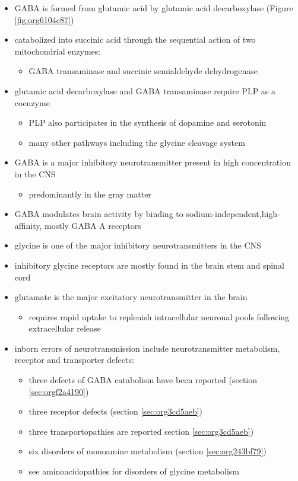 \documentclass{scrartcl}
\begin{document}
\begin{itemize}
\item GABA is formed from glutamic acid by glutamic acid decarboxylase
(Figure \ref{fig:org6104c87})
\item catabolized into succinic acid through the sequential action of two
mitochondrial enzymes:
\begin{itemize}
\item GABA transaminase and succinic semialdehyde dehydrogenase
\end{itemize}
\item glutamic acid decarboxylase and GABA transaminase require PLP as a coenzyme
\begin{itemize}
\item PLP also participates in the synthesis of dopamine and serotonin
\item many other pathways including the glycine cleavage system
\end{itemize}
\item GABA is a major inhibitory neurotransmitter present in high
concentration in the CNS
\begin{itemize}
\item predominantly in the gray matter
\end{itemize}
\item GABA modulates brain activity by binding to
sodium-independent,high-affinity, mostly GABA A receptors
\item glycine is one of the major inhibitory neurotransmitters in the CNS
\item inhibitory glycine receptors are mostly found in the brain stem
and spinal cord
\item glutamate is the major excitatory neurotransmitter in the brain
\begin{itemize}
\item requires rapid uptake to replenish intracellular
neuronal pools following extracellular release
\end{itemize}
\item inborn errors of neurotransmission include neurotransmitter
metabolism, receptor and transporter defects:
\begin{itemize}
\item three defects of GABA catabolism have been reported (section \ref{sec:orgf2a4190})
\item three receptor defects (section \ref{sec:org3cd5aeb})
\item three transportopathies are reported section \ref{sec:org3cd5aeb})
\item six disorders of monoamine metabolism (section \ref{sec:org243bf79})
\item see aminoacidopathies for disorders of glycine metabolism
\end{itemize}
\end{itemize}
\end{document}
